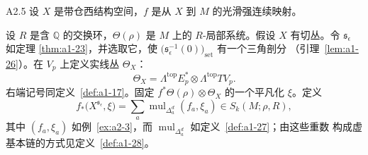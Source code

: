 \begin{example}{A2.5}\label{ex:a2-5}
设 $X$ 是带仓西结构空间，$f$ 是从 $X$ 到 $M$ 的光滑强连续映射。

设 $R$ 是含 $\mathbb Q$ 的交换环，$\Theta(\rho)$ 是 $M$ 上的
$R$-局部系统。假设 $X$ 有切丛。令 $\mathfrak s_\epsilon$ 如定理
\ref{thm:a1-23}，并选取它，使
$\bigl(\mathfrak s_\epsilon^{-1}(0)\bigr)_{\mathrm{set}}$ 有一个三角剖分
（引理~\ref{lem:a1-26}）。在 $V_p$ 上定义实线丛 $\Theta_X$：
\begin{equation}
 \Theta_X=\Lambda^{\mathrm{top}}E_p^*
 \otimes\Lambda^{\mathrm{top}}TV_p.
 \tag{A2.18}\label{eq:a2-18}
\end{equation}
右端记号同定义~\ref{def:a1-17}。固定
$f^*\Theta(\rho)\otimes\Theta_X$ 的一个平凡化 $\xi$。定义
\[
 f_*\bigl(X^{\mathfrak s_\epsilon},\xi\bigr)
 =\sum_a\operatorname{mul}_{\Delta_a^d}(f_a,\xi_a)
 \in S_k(M;\rho,R),
\]
其中 $(f_a,\xi_a)$ 如例~\ref{ex:a2-3}，而
$\operatorname{mul}_{\Delta_a^d}$ 如定义~\ref{def:a1-27}；由这些重数
构成虚基本链的方式见定义~\ref{def:a1-28}。
\end{example}
